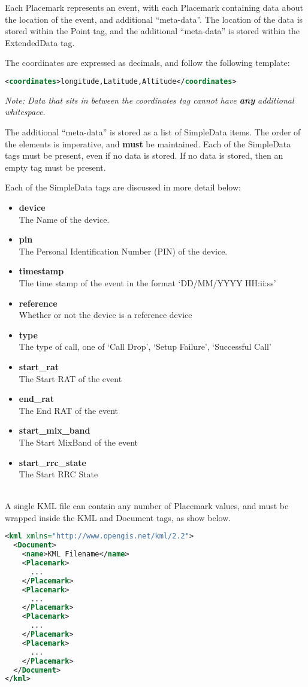 Each Placemark represents an event, with each Placemark containing data about 
the location of the event, and additional ``meta-data''. The location of the 
data is stored within the Point tag, and the additional ``meta-data'' is stored 
within the ExtendedData tag. 

The coordinates are expressed as decimals, and follow the following template:

\begin{lstlisting}[language=XML]
  <coordinates>longitude,Latitude,Altitude</coordinates>
\end{lstlisting}

{\em Note: Data that sits in between the coordinates tag cannot have {\bf any} 
additional whitespace.}

The additional ``meta-data'' is stored as a list of SimpleData items. The 
order of the elements is imperative, and {\bf must} be maintained. Each of the 
SimpleData tags must be present, even if no data is stored. If no data is 
stored, then an empty tag must be present.

Each of the SimpleData tags are discussed in more detail below:
\begin{itemize}
  \item {\bf device} \\
        The Name of the device.
  \item {\bf pin} \\
        The Personal Identification Number (PIN) of the device.
  \item {\bf timestamp} \\
        The time stamp of the event in the format `DD/MM/YYYY HH:ii:ss'
  \item {\bf reference} \\
        Whether or not the device is a reference device
  \item {\bf type} \\
        The type of call, one of `Call Drop', `Setup Failure', `Successful Call'
  \item {\bf start\_rat} \\
        The Start RAT of the event
  \item {\bf end\_rat} \\
        The End RAT of the event
  \item {\bf start\_mix\_band} \\
        The Start MixBand of the event
  \item {\bf start\_rrc\_state} \\
        The Start RRC State
\end{itemize}

~\\
A single KML file can contain any number of Placemark values, and must be 
wrapped inside the KML and Document tags, as show below. 

\begin{lstlisting}[language=XML]
<kml xmlns="http://www.opengis.net/kml/2.2">
  <Document>
    <name>KML Filename</name>
    <Placemark>
      ...
    </Placemark>
    <Placemark>
      ...
    </Placemark>
    <Placemark>
      ...
    </Placemark>
    <Placemark>
      ...
    </Placemark>
  </Document>
</kml>
\end{lstlisting}